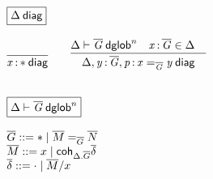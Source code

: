 
\newcommand\diagbase[0]{\ensuremath{\mathord{*}}}
\newcommand\interpdiag[2]{\ensuremath{[ #1 ]_{#2}}}

\begin{small}
\[
\begin{array}{l}

\framebox{\wfdiag{\Delta}} \\ \\

\infer{\wfdiag{\tptm{x}{\diagbase}}}{} 
\qquad
\infer{\wfdiag{\Delta,\tptm{y}{\diag G},\tptm{p}{\homj{\diag{G}}{x}{y}}}}
      {\wfdglob{\Delta}{\diag G}{n} &
       \tptm{x}{\diag{G}} \in \Delta &
      } \\
\\ \\

\framebox{\wfdglob{\Delta}{\diag G}{n}} \\ \\

\diag G ::= \diagbase \mid \homj{\diag G}{\diag M}{\diag N} \\

\diag M ::= x \mid \dcoh{\Delta.\diag G}{\diag \delta} \\

\diag \delta ::= \cdot \mid \diag M / x \\
\end{array}
\]
\end{small}


